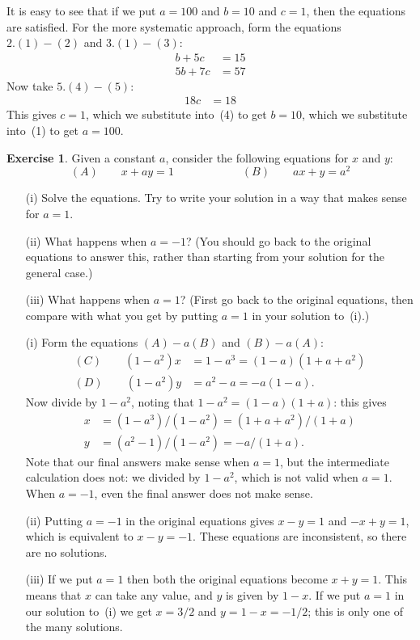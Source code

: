 \documentclass[a4paper]{amsart}
\theoremstyle{definition}
\newtheorem{exercise}{Exercise}[section]
\newenvironment{solution}{{\noindent \bf Solution:}}{}
\begin{document}
\begin{solution}
 It is easy to see that if we put $a=100$ and $b=10$ and $c=1$, then
 the equations are satisfied.  For the more systematic approach, form
 the equations $2.(1)-(2)$ and $3.(1)-(3)$:
 \begin{align*}
  b  + 5c &= 15 \tag{4} \\
  5b + 7c &= 57 \tag{5}
 \end{align*}
 Now take $5.(4)-(5)$:
 \begin{align*}
  18 c &= 18 \tag{6}
 \end{align*}
 This gives $c=1$, which we substitute into~(4) to get $b=10$, which
 we substitute into~(1) to get $a=100$.
\end{solution}
\begin{exercise}\label{ex-lin-degen}
Given a constant $a$, consider the following equations for $x$ and $y$:
 \[ (A)\qquad x + ay = 1   \hspace{6em} (B)\qquad ax + y = a^2 \]
 \begin{itemize}
  \item[(i)] Solve the equations.   Try to write your solution in a
   way that makes sense for $a=1$. 
  \item[(ii)] What happens when $a=-1$?  (You should go back to the
   original equations to answer this, rather than starting from your
   solution for the general case.)
  \item[(iii)] What happens when $a=1$?  (First go back to the original
   equations, then compare with what you get by putting $a=1$ in your
   solution to~(i).)
 \end{itemize}
\end{exercise}
\begin{solution}
 \begin{itemize}
  \item[(i)]
   Form the equations $(A)-a(B)$ and $(B)-a(A)$:
   \begin{align*}
    (C)\qquad (1-a^2)x &= 1-a^3 = (1-a)(1+a+a^2) \\
    (D)\qquad (1-a^2)y &= a^2-a = -a(1-a).
   \end{align*}
   Now divide by $1-a^2$, noting that $1-a^2=(1-a)(1+a)$: this gives
   \begin{align*}
    x &= (1-a^3)/(1-a^2) = (1+a+a^2)/(1+a) \\
    y &= (a^2-1)/(1-a^2) = -a/(1+a).
   \end{align*}
   Note that our final answers make sense when $a=1$, but the
   intermediate calculation does not: we divided by $1-a^2$, which is
   not valid when $a=1$.  When $a=-1$, even the final answer does not
   make sense.
  \item[(ii)]
   Putting $a=-1$ in the original equations gives $x-y=1$ and
   $-x+y=1$, which is equivalent to $x-y=-1$.  These equations are
   inconsistent, so there are no solutions.
  \item[(iii)] 
   If we put $a=1$ then both the original equations become $x+y=1$.
   This means that $x$ can take any value, and $y$ is given by $1-x$.
   If we put $a=1$ in our solution to~(i) we get $x=3/2$ and
   $y=1-x=-1/2$; this is only one of the many solutions.
 \end{itemize}
\end{solution}
\end{document}
